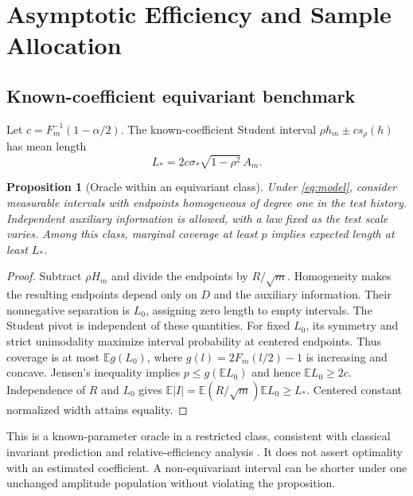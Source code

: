 \documentclass[nolineno]{ieeeaccess}
\newtheorem{proposition}{Proposition}
\newcommand{\E}{\mathbb{E}}
\begin{document}
\section{Asymptotic Efficiency and Sample Allocation}
\subsection{Known-coefficient equivariant benchmark}
Let $c=F_m^{-1}(1-\alpha/2)$. The known-coefficient Student interval $\rho h_m\pm c s_\rho(h)$ has mean length
\begin{equation}
L_* = 2c\sigma_*\sqrt{1-\rho^2}\,A_m.
\label{eq:oracle}
\end{equation}
\begin{proposition}[Oracle within an equivariant class]
Under \eqref{eq:model}, consider measurable intervals with endpoints homogeneous of degree one in the test history. Independent auxiliary information is allowed, with a law fixed as the test scale varies. Among this class, marginal coverage at least $p$ implies expected length at least $L_*$.
\end{proposition}
\begin{proof}
Subtract $\rho H_m$ and divide the endpoints by $R/\sqrt m$. Homogeneity makes the resulting endpoints depend only on $D$ and the auxiliary information. Their nonnegative separation is $L_0$, assigning zero length to empty intervals. The Student pivot is independent of these quantities. For fixed $L_0$, its symmetry and strict unimodality maximize interval probability at centered endpoints. Thus coverage is at most $\E g(L_0)$, where $g(l)=2F_m(l/2)-1$ is increasing and concave. Jensen's inequality implies $p\leq g(\E L_0)$ and hence $\E L_0\geq2c$. Independence of $R$ and $L_0$ gives $\E|I|=\E(R/\sqrt m)\E L_0\geq L_*$. Centered constant normalized width attains equality.
\end{proof}
This is a known-parameter oracle in a restricted class, consistent with classical invariant prediction and relative-efficiency analysis \cite{takada1995,kabaila2007}. It does not assert optimality with an estimated coefficient. A non-equivariant interval can be shorter under one unchanged amplitude population without violating the proposition.
\end{document}
